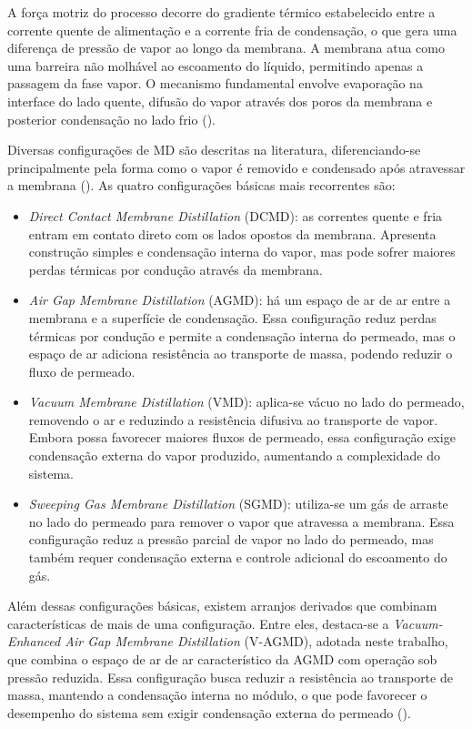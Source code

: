 A força motriz do processo decorre do gradiente térmico estabelecido entre a corrente quente de alimentação e a corrente fria de condensação, o que gera uma diferença de pressão de vapor ao longo da membrana. A membrana atua como uma barreira não molhável ao escoamento do líquido, permitindo apenas a passagem da fase vapor. O mecanismo fundamental envolve evaporação na interface do lado quente, difusão do vapor através dos poros da membrana e posterior condensação no lado frio (\cite{Cath2010, Hitsov2015}).

Diversas configurações de MD são descritas na literatura, diferenciando-se principalmente pela forma como o vapor é removido e condensado após atravessar a membrana (\cite{Cath2010, Warsinger2017, AlZoubi2018, Chong2022}). As quatro configurações básicas mais recorrentes são:

\begin{itemize}
    \item \textit{Direct Contact Membrane Distillation} (DCMD): as correntes quente e fria entram em contato direto com os lados opostos da membrana. Apresenta construção simples e condensação interna do vapor, mas pode sofrer maiores perdas térmicas por condução através da membrana.

    \item \textit{Air Gap Membrane Distillation} (AGMD): há um espaço de ar de ar entre a membrana e a superfície de condensação. Essa configuração reduz perdas térmicas por condução e permite a condensação interna do permeado, mas o espaço de ar adiciona resistência ao transporte de massa, podendo reduzir o fluxo de permeado.

    \item \textit{Vacuum Membrane Distillation} (VMD): aplica-se vácuo no lado do permeado, removendo o ar e reduzindo a resistência difusiva ao transporte de vapor. Embora possa favorecer maiores fluxos de permeado, essa configuração exige condensação externa do vapor produzido, aumentando a complexidade do sistema.

    \item \textit{Sweeping Gas Membrane Distillation} (SGMD): utiliza-se um gás de arraste no lado do permeado para remover o vapor que atravessa a membrana. Essa configuração reduz a pressão parcial de vapor no lado do permeado, mas também requer condensação externa e controle adicional do escoamento do gás.
\end{itemize}

Além dessas configurações básicas, existem arranjos derivados que combinam características de mais de uma configuração. Entre eles, destaca-se a \textit{Vacuum-Enhanced Air Gap Membrane Distillation} (V-AGMD), adotada neste trabalho, que combina o espaço de ar de ar característico da AGMD com operação sob pressão reduzida. Essa configuração busca reduzir a resistência ao transporte de massa, mantendo a condensação interna no módulo, o que pode favorecer o desempenho do sistema sem exigir condensação externa do permeado (\cite{Lisboa2024}).

